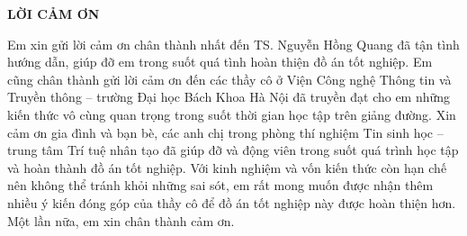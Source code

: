 \documentclass[../DoAn.tex]{subfiles}
\begin{document}
\begin{center}
    \Large{\textbf{LỜI CẢM ƠN}}\\
\end{center}
\vspace{1cm}
Em xin gửi lời cảm ơn chân thành nhất đến TS. Nguyễn Hồng Quang đã tận tình hướng dẫn, giúp đỡ em trong suốt quá tình hoàn thiện đồ án tốt nghiệp. Em cũng chân thành gửi lời cảm ơn đến các thầy cô ở Viện Công nghệ Thông tin và Truyền thông – trường Đại học Bách Khoa Hà Nội đã  truyền đạt cho em những kiến thức vô cùng quan trọng trong suốt thời gian học tập trên giảng đường. Xin cảm ơn gia đình và bạn bè, các anh chị trong phòng thí nghiệm Tin sinh học – trung tâm Trí tuệ nhân tạo đã giúp đỡ và động viên trong suốt quá trình học tập và hoàn thành đồ án tốt nghiệp. Với kinh nghiệm và vốn kiến thức còn hạn chế nên không thể tránh khỏi những sai sót, em rất mong muốn được nhận thêm nhiều ý kiến đóng góp của thầy cô để đồ án tốt nghiệp này được hoàn thiện hơn.
Một lần nữa, em xin chân thành cảm ơn.
\end{document}
